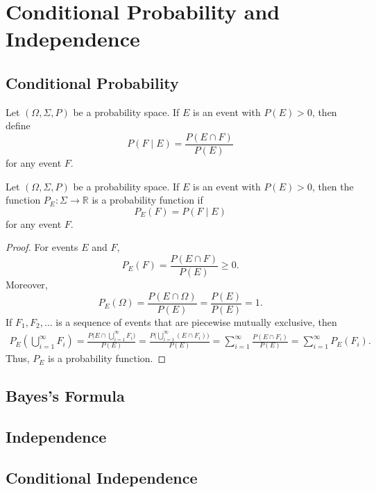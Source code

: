 \chapter{Conditional Probability and Independence}
\section{Conditional Probability}
\begin{definition}
  Let $(\Omega, \Sigma, P)$ be a probability space.
  If $E$ is an event with $P(E) > 0$, then define
  \begin{equation*}
    P(F \mid E) = \frac{P(E \cap F)}{P(E)}
  \end{equation*}
  for any event $F$.
\end{definition}

\begin{theorem}
  Let $(\Omega, \Sigma, P)$ be a probability space.
  If $E$ is an event with $P(E) > 0$, then the function
  $P_E: \Sigma \to \mathbb{R}$ is a probability function if
  \begin{equation*}
    P_E(F) = P(F \mid E)
  \end{equation*}
  for any event $F$.
\end{theorem}
\begin{proof}
  For events $E$ and $F$,
  \begin{equation*}
    P_E(F) = \frac{P(E \cap F)}{P(E)} \geq 0.
  \end{equation*}
  Moreover,
  \begin{equation*}
    P_E(\Omega) = \frac{P(E \cap \Omega)}{P(E)}
                = \frac{P(E)}{P(E)}
                = 1.
  \end{equation*}
  If $F_1, F_2, \dots$ is a sequence of events that are piecewise
  mutually exclusive, then
  \begin{align*}
    P_E\left(\bigcup_{i=1}^\infty F_i\right)
    = \frac{P\Big(E \cap \bigcup_{i=1}^\infty F_i\Big)}
           {P(E)}
    = \frac{P\Big(\bigcup_{i=1}^\infty (E \cap F_i)\Big)}
           {P(E)}
    = \sum_{i=1}^\infty \frac{P(E \cap F_i)}{P(E)}
    = \sum_{i=1}^\infty P_E(F_i).
  \end{align*}
  Thus, $P_E$ is a probability function.
\end{proof}

\section{Bayes's Formula}

\section{Independence}

\section{Conditional Independence}